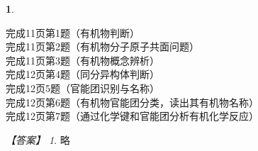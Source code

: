 \documentclass[UTF8, 10pt, a4paper, oneside]{ctexart}
\newcommand{\fs}[1]{{\fangsong #1}}%
\theoremstyle{definition}
\newtheorem{exercise}{}
\theoremstyle{remark}
\newtheorem*{answer}{【答案】}
\theoremstyle{plain}
\begin{document}
\newpage
\begin{exercise}
    \begin{multicols}{2}
        \noindent 完成11页第1题（有机物判断）\\
        完成11页第2题（有机物分子原子共面问题）\\
        完成11页第3题（有机物概念辨析）\\
        完成12页第4题（同分异构体判断）\\
        完成12页5题（官能团识别与名称）\\
        完成12页第6题（有机物官能团分类，读出其有机物名称）\\
        完成12页第7题（通过化学键和官能团分析有机化学反应）
    \end{multicols}

    \begin{answer}
        \fs{略}
    \end{answer}
\end{exercise}
\end{document}
